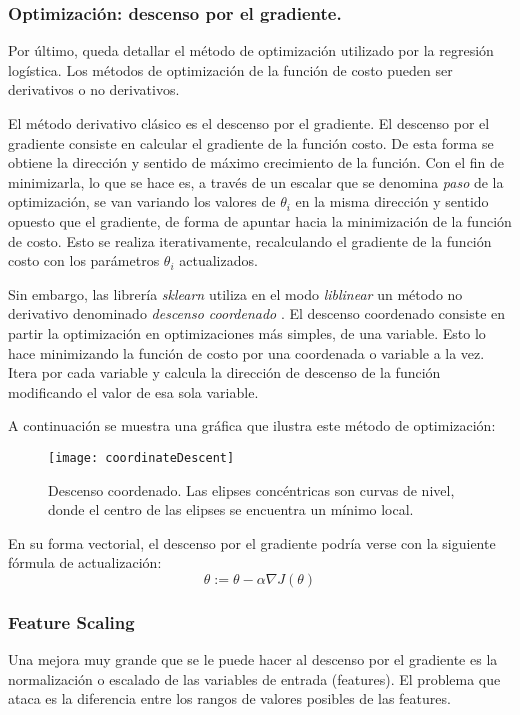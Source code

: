 \subsubsection{Optimización: descenso por el gradiente.}
Por último, queda detallar el método de optimización utilizado por la regresión logística. Los métodos de optimización de la función de costo pueden ser derivativos o no derivativos.

El método derivativo clásico es el descenso por el gradiente. El descenso por el gradiente consiste en calcular el gradiente de la función costo. De esta forma se obtiene la dirección y sentido de máximo crecimiento de la función. Con el fin de minimizarla, lo que se hace es, a través de un escalar que se denomina \textit{paso} de la optimización, se van variando los valores de $\theta_{i}$ en la misma dirección y sentido opuesto que el gradiente, de forma de apuntar hacia la minimización de la función de costo. Esto se realiza iterativamente, recalculando el gradiente de la función costo con los parámetros $\theta_{i}$ actualizados.

Sin embargo, las librería \textit{sklearn} utiliza en el modo \textit{liblinear} un método no derivativo denominado \textit{descenso coordenado} \cite{sklearnLinearModel}. El descenso coordenado consiste en partir la optimización en optimizaciones más simples, de una variable. Esto lo hace minimizando la función de costo por una coordenada o variable a la vez. Itera por cada variable y calcula la dirección de descenso de la función modificando el valor de esa sola variable.

A continuación se muestra una gráfica que ilustra este método de optimización:

\begin{figure}[H]
\centering
\texttt{[image: coordinateDescent]}
\caption{Descenso coordenado. Las elipses concéntricas son curvas de nivel, donde el centro de las elipses se encuentra un mínimo local. \cite{wikipediaCoordinateDescent}}
\label{fig:coordinateDescent}
\end{figure}

En su forma vectorial, el descenso por el gradiente podría verse con la siguiente fórmula de actualización:
\begin{equation} \label{eq:gdesc}
\theta := \theta - \alpha \nabla J(\theta)
\end{equation}

\subsubsection{Feature Scaling}
Una mejora muy grande que se le puede hacer al descenso por el gradiente es la normalización o escalado de las variables de entrada (features). El problema que ataca es la diferencia entre los rangos de valores posibles de las features.

